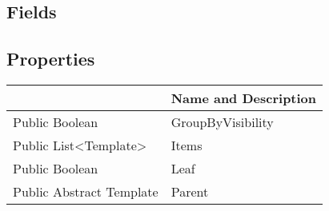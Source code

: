 \documentclass[11pt, oneside, a4paper]{book}
\begin{document}
\subsection{Fields}

\subsection{Properties}
\begin{center}
\begin{tabular}{| p{3cm} | p{12cm} | }
\hline
\textbf{ } & \textbf{ Name and Description}\\
\hline
 Public  Boolean &  GroupByVisibility\hypertarget{SoftwareEngineeringTools.{}Documentation.{}MethodListTemplate.{}GroupByVisibility}{}\\
\hline
 Public  List<Template> &  Items\hypertarget{SoftwareEngineeringTools.{}Documentation.{}MethodListTemplate.{}Items}{}\\
\hline
 Public  Boolean &  Leaf\hypertarget{SoftwareEngineeringTools.{}Documentation.{}MethodListTemplate.{}Leaf}{}\\
\hline
 Public  Abstract  Template &  Parent\hypertarget{SoftwareEngineeringTools.{}Documentation.{}MethodListTemplate.{}Parent}{}\\
\hline
\end{tabular}
\end{center}
\end{document}
